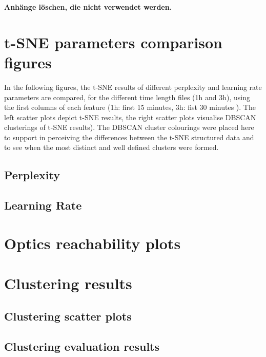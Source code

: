 \begin{appendices}
\textbf{\color{red} Anhänge löschen, die nicht verwendet werden.}

\section{t-SNE parameters comparison figures}
\label{appendix:tSNEParameters}
In the following figures, the t-SNE results of different perplexity and learning rate parameters are compared, for the different time length files (1h and 3h), using the first columns of each feature (1h: first 15 minutes, 3h: fist 30 minutes ). The left scatter plots depict t-SNE results, the right scatter plots visualise DBSCAN clusterings of t-SNE results). The DBSCAN cluster colourings were placed here to support in perceiving the differences between the t-SNE structured data and to see when the most distinct and well defined clusters were formed.

	\subsection{Perplexity}
	\label{appendix:tSNEParametersPerplexity}
	

	\subsection{Learning Rate}
	\label{appendix:tSNEParametersLearningRate}
	


\section{Optics reachability plots}
\label{appendix:OPTICSReachabilityPlots}


\section{Clustering results}

	\subsection{Clustering scatter plots}
	\label{appendix:clusteringResults}
	

	\subsection{Clustering evaluation results}
	\label{appendix:clusteringEvaluationResults}
	









\end{appendices}
